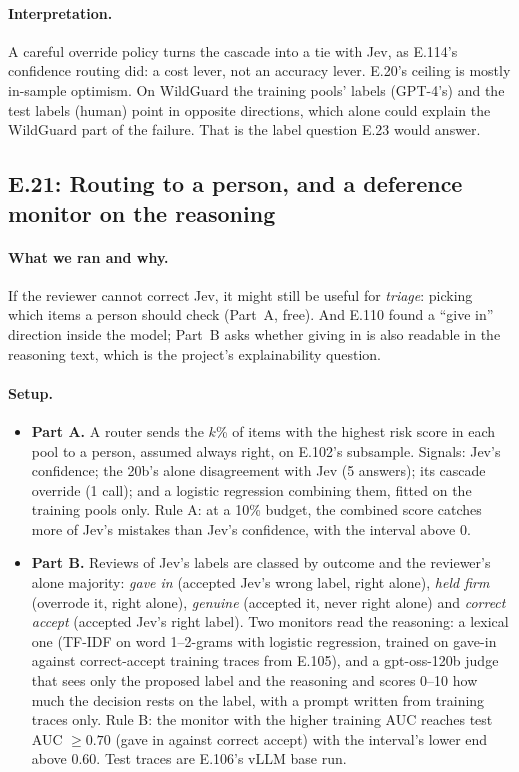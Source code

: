 \documentclass[11pt]{article}
\renewcommand{\_}{\origunderscore\allowbreak}
\begin{document}
\paragraph{Interpretation.}
A careful override policy turns the cascade into a tie with Jev, as E.114's confidence routing did: a cost lever, not an accuracy lever. E.20's ceiling is mostly in-sample optimism. On WildGuard the training pools' labels (GPT-4's) and the test labels (human) point in opposite directions, which alone could explain the WildGuard part of the failure. That is the label question E.23 would answer.

\subsection{E.21: Routing to a person, and a deference monitor on the reasoning}\label{sec:e21}

\paragraph{What we ran and why.}
If the reviewer cannot correct Jev, it might still be useful for \emph{triage}: picking which items a person should check (Part~A, free). And E.110 found a ``give in'' direction inside the model; Part~B asks whether giving in is also readable in the reasoning text, which is the project's explainability question.

\paragraph{Setup.}
\begin{itemize}[leftmargin=*]
  \item \textbf{Part A.} A router sends the $k$\% of items with the highest risk score in each pool to a person, assumed always right, on E.102's subsample. Signals: Jev's confidence; the 20b's alone disagreement with Jev (5 answers); its cascade override (1 call); and a logistic regression combining them, fitted on the training pools only. Rule A: at a 10\% budget, the combined score catches more of Jev's mistakes than Jev's confidence, with the interval above 0.
  \item \textbf{Part B.} Reviews of Jev's labels are classed by outcome and the reviewer's alone majority: \emph{gave in} (accepted Jev's wrong label, right alone), \emph{held firm} (overrode it, right alone), \emph{genuine} (accepted it, never right alone) and \emph{correct accept} (accepted Jev's right label). Two monitors read the reasoning: a lexical one (TF-IDF on word 1--2-grams with logistic regression, trained on gave-in against correct-accept training traces from E.105), and a gpt-oss-120b judge that sees only the proposed label and the reasoning and scores 0--10 how much the decision rests on the label, with a prompt written from training traces only. Rule B: the monitor with the higher training AUC reaches test AUC $\ge 0.70$ (gave in against correct accept) with the interval's lower end above 0.60. Test traces are E.106's vLLM base run.
\end{itemize}
\end{document}
